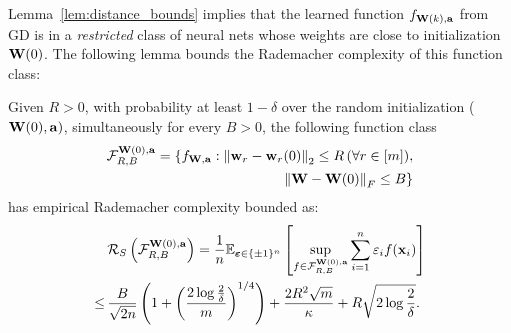 Lemma~\ref{lem:distance_bounds} implies that the learned function $f_{\mathbf{W}(k), \mathbf{a}}$ from GD is in a \emph{restricted} class of neural nets whose weights are close to initialization $\mathbf{W}(0)$.
The following lemma bounds the Rademacher complexity of this function class:




\begin{lem}\label{lem:rad_dist_func_class}
Given $R>0$,
with probability at least $1-\delta$ over the random initialization ($\mathbf{W}(0),\mathbf{a})$, simultaneously for every $B>0$, the following function class
\begin{align*}
\mathcal{F}^{\mathbf{W}(0),\mathbf{a}}_{R,B}  = \{ f_{\mathbf{W}, \mathbf{a}} : \left\|\mathbf{w}_r - \mathbf{w}_r(0)\right\|_2 \le R \, (\forall r\in[m]), \\ \left\|\mathbf{W} - \mathbf{W}(0)\right\|_F \le B \}
\end{align*}
has empirical Rademacher complexity bounded as:
\begin{align*}
	&\mathcal{R}_S\left( \mathcal{F}^{\mathbf{W}(0),\mathbf{a}}_{R,B} \right)
   =  \frac{1}{n} \mathbb{E}_{\bm {\varepsilon} \in \{\pm1\}^n}\left[\sup_{f \in \mathcal{F}^{\mathbf{W}(0),\mathbf{a}}_{R,B}}\sum_{i=1}^{n} \varepsilon_i f(\mathbf{x}_i)\right]
	\\
	\le \,&	\frac{B}{\sqrt{2n}} \left(1+\left( \frac{2\log \frac2\delta}{m} \right)^{1/4} \right) + \frac{2 R^2 \sqrt m}{ \kappa} + R \sqrt{2\log \frac2\delta} .
\end{align*}
\end{lem}

